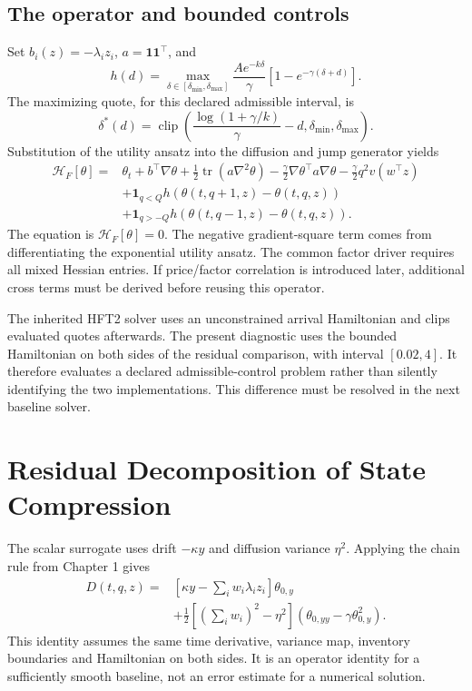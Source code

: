 \section{The operator and bounded controls}
Set $b_i(z)=-\lambda_i z_i$, $a=\mathbf1\mathbf1^\top$, and
\[
 h(d)=\max_{\delta\in[\delta_{\min},\delta_{\max}]}
 \frac{A e^{-k\delta}}\gamma\left[1-e^{-\gamma(\delta+d)}\right].
\]
The maximizing quote, for this declared admissible interval, is
\[
 \delta^*(d)=\operatorname{clip}\!\left(
 \frac{\log(1+\gamma/k)}\gamma-d,
 \delta_{\min},\delta_{\max}\right).
\]
Substitution of the utility ansatz into the diffusion and jump generator yields
\begin{align*}
 \mathcal H_F[\theta]={}&\theta_t+b^\top\nabla\theta
 +\tfrac12\operatorname{tr}(a\nabla^2\theta)
 -\tfrac\gamma2\nabla\theta^\top a\nabla\theta
 -\tfrac\gamma2q^2v(w^\top z)\\
 &+\mathbf1_{q<Q}h(\theta(t,q+1,z)-\theta(t,q,z))\\
 &+\mathbf1_{q>-Q}h(\theta(t,q-1,z)-\theta(t,q,z)).
\end{align*}
The equation is $\mathcal H_F[\theta]=0$. The negative gradient-square term comes from differentiating the exponential utility ansatz. The common factor driver requires all mixed Hessian entries. If price/factor correlation is introduced later, additional cross terms must be derived before reusing this operator.

The inherited HFT2 solver uses an unconstrained arrival Hamiltonian and clips evaluated quotes afterwards. The present diagnostic uses the bounded Hamiltonian on both sides of the residual comparison, with interval $[0.02,4]$. It therefore evaluates a declared admissible-control problem rather than silently identifying the two implementations. This difference must be resolved in the next baseline solver.

\chapter{Residual Decomposition of State Compression}

The scalar surrogate uses drift $-\kappa y$ and diffusion variance $\eta^2$. Applying the chain rule from Chapter 1 gives
\begin{align*}
 D(t,q,z)={}&\left[\kappa y-\sum_iw_i\lambda_i z_i\right]\theta_{0,y}\\
 &+\frac12\left[\left(\sum_iw_i\right)^2-\eta^2\right]
 \left(\theta_{0,yy}-\gamma\theta_{0,y}^2\right).
\end{align*}
This identity assumes the same time derivative, variance map, inventory boundaries and Hamiltonian on both sides. It is an operator identity for a sufficiently smooth baseline, not an error estimate for a numerical solution.

